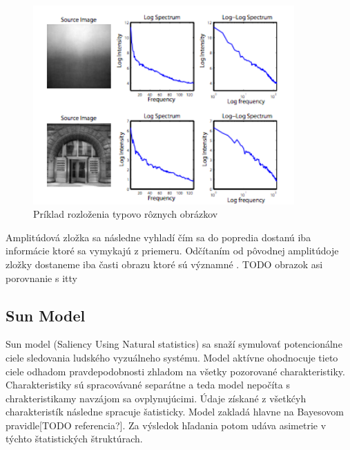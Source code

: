 \begin{figure}[H]
  \centering
  \includegraphics[width=10cm]{pics/spectral-rezidual-1.png}
  \caption{Príklad rozloženia typovo rôznych obrázkov}\label{wrap-fig:2}
\end{figure}
\vspace{10mm}

Amplitúdová zložka sa následne vyhladí čím sa do popredia dostanú iba informácie ktoré sa vymykajú z priemeru. Odčítaním od pôvodnej amplitúdoje zložky dostaneme iba časti obrazu ktoré sú významné \cite{spectral-rezidual}.
TODO obrazok asi porovnanie s itty
\subsection{Sun Model}
Sun model (Saliency Using Natural statistics) sa snaží symulovať potencionálne ciele sledovania ludského vyzuálneho systému. Model aktívne ohodnocuje tieto ciele odhadom pravdepodobnosti zhladom na všetky pozorované charakteristiky. Charakteristiky sú spracovávané separátne a teda model nepočíta s chrakteristikamy navzájom sa ovplynujúcimi. Údaje získané z všetkćyh charakteristík  následne spracuje šatisticky. Model zakladá hlavne na Bayesovom pravidle[TODO referencia?]. Za výsledok hľadania potom udáva asimetrie v týchto štatistických štruktúrach\cite{sun-1}.

